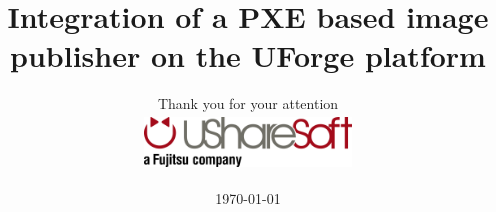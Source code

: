 \documentclass[xcolor=x11names,compress]{beamer}
\renewcommand{\(}{\begin{columns}}
\renewcommand{\)}{\end{columns}}
\newcommand{\<}[1]{\begin{column}{#1}}
\renewcommand{\>}{\end{column}}
\begin{document}

\begin{frame}
\title{Integration of a PXE based image publisher on the UForge platform}
\author
{
	Thank you for your attention\\
	\vspace{2cm}
	\includegraphics[height=1.5cm,width=5.5cm]{logo/logo_usharesoft.png}
}
\date
{
	\vspace{1cm}
	\today
}
\titlepage
\end{frame}
\end{document}
